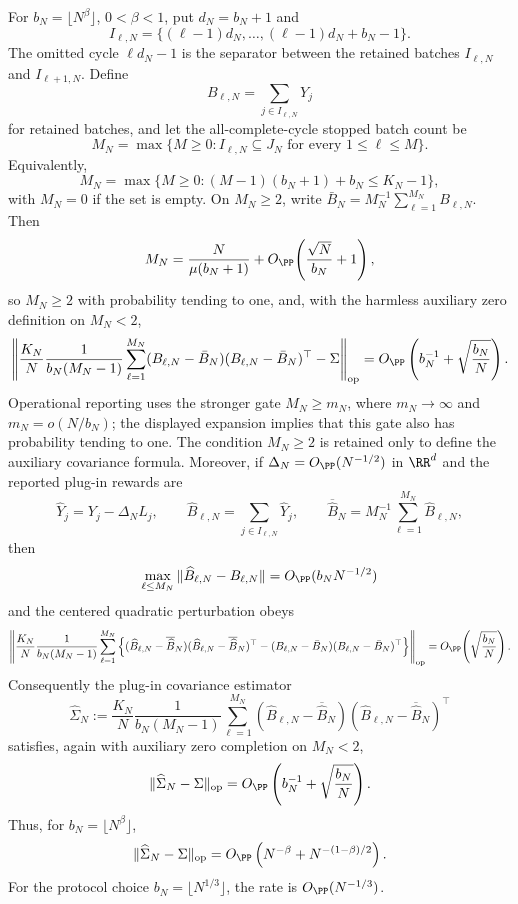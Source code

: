 \begin{theorem}
For \(b_N=\lfloor N^\beta\rfloor\), \(0<\beta<1\), put \(d_N=b_N+1\) and
\[
I_{\ell,N}=\{(\ell-1)d_N,\ldots,(\ell-1)d_N+b_N-1\}.
\]
The omitted cycle \(\ell d_N-1\) is the separator between the retained
batches \(I_{\ell,N}\) and \(I_{\ell+1,N}\).  Define
\[
B_{\ell,N}=\sum_{j\in I_{\ell,N}}Y_j
\]
for retained batches, and let the all-complete-cycle stopped batch count be
\[
M_N=\max\{M\ge0:I_{\ell,N}\subseteq J_N
        \text{ for every }1\le\ell\le M\}.
\]
Equivalently,
\[
M_N=\max\{M\ge0:(M-1)(b_N+1)+b_N\le K_N-1\},
\]
with \(M_N=0\) if the set is empty.  On \(M_N\ge2\), write
\(\bar B_N=M_N^{-1}\sum_{\ell=1}^{M_N}B_{\ell,N}\).  Then
\[
M_N=\frac{N}{\mu(b_N+1)}
    +O_{\PP}\!\left(\frac{\sqrt N}{b_N}+1\right),
\]
so \(M_N\ge2\) with probability tending to one, and, with the harmless
auxiliary zero definition on \(M_N<2\),
\[
\left\|
\frac{K_N}{N}\frac1{b_N(M_N-1)}
\sum_{\ell=1}^{M_N}(B_{\ell,N}-\bar B_N)(B_{\ell,N}-\bar B_N)^\top
-\Sigma
\right\|_{\operatorname{op}}
=O_{\PP}\left(b_N^{-1}+\sqrt{\frac{b_N}{N}}\right).
\]
Operational reporting uses the stronger gate \(M_N\ge m_N\), where
\(m_N\to\infty\) and \(m_N=o(N/b_N)\); the displayed expansion implies that
this gate also has probability tending to one.  The condition \(M_N\ge2\) is
retained only to define the auxiliary covariance formula.
Moreover, if \(\Delta_N=O_{\PP}(N^{-1/2})\) in \(\RR^d\) and the reported
plug-in rewards are
\[
\widehat Y_j=Y_j-\Delta_NL_j,\qquad
\widehat B_{\ell,N}=\sum_{j\in I_{\ell,N}}\widehat Y_j,\qquad
\overline{\widehat B}_N=M_N^{-1}\sum_{\ell=1}^{M_N}\widehat B_{\ell,N},
\]
then
\[
\max_{\ell\le M_N}\|\widehat B_{\ell,N}-B_{\ell,N}\|
=O_{\PP}(b_NN^{-1/2})
\]
and the centered quadratic perturbation obeys
\[
\left\|
\frac{K_N}{N}\frac1{b_N(M_N-1)}
\sum_{\ell=1}^{M_N}
\left\{
(\widehat B_{\ell,N}-\overline{\widehat B}_N)
(\widehat B_{\ell,N}-\overline{\widehat B}_N)^\top
-(B_{\ell,N}-\bar B_N)(B_{\ell,N}-\bar B_N)^\top
\right\}
\right\|_{\operatorname{op}}
=O_{\PP}\!\left(\sqrt{\frac{b_N}{N}}\right).
\]
Consequently the plug-in covariance estimator
\[
\widehat\Sigma_N:=
\frac{K_N}{N}\frac1{b_N(M_N-1)}
\sum_{\ell=1}^{M_N}
(\widehat B_{\ell,N}-\overline{\widehat B}_N)
(\widehat B_{\ell,N}-\overline{\widehat B}_N)^\top
\]
satisfies, again with auxiliary zero completion on \(M_N<2\),
\[
\|\widehat\Sigma_N-\Sigma\|_{\operatorname{op}}
=O_{\PP}\left(b_N^{-1}+\sqrt{\frac{b_N}{N}}\right).
\]
Thus, for \(b_N=\lfloor N^\beta\rfloor\),
\[
\|\widehat\Sigma_N-\Sigma\|_{\operatorname{op}}
=O_{\PP}\left(N^{-\beta}+N^{-(1-\beta)/2}\right).
\]
For the protocol choice \(b_N=\lfloor N^{1/3}\rfloor\), the rate is
\(O_{\PP}(N^{-1/3})\).
\end{theorem}

